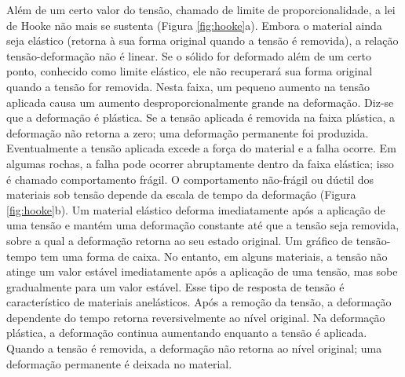 \documentclass[]{book}
\theoremstyle{definition}
\theoremstyle{definition}
\theoremstyle{definition}
\theoremstyle{remark}
\begin{document}
Além de um certo valor do tensão, chamado de limite de proporcionalidade, a lei de Hooke não mais se sustenta (Figura \ref{fig:hooke}a). Embora o material ainda seja elástico (retorna à sua forma original quando a tensão é removida), a relação tensão-deformação não é linear. Se o sólido for deformado além de um certo ponto, conhecido como limite elástico, ele não recuperará sua forma original quando a tensão for removida. Nesta faixa, um pequeno aumento na tensão aplicada causa um aumento desproporcionalmente grande na deformação. Diz-se que a deformação é plástica. Se a tensão aplicada é removida na faixa plástica, a deformação não retorna a zero; uma deformação permanente foi produzida. Eventualmente a tensão aplicada excede a força do material e a falha ocorre. Em algumas rochas, a falha pode ocorrer abruptamente dentro da faixa elástica; isso é chamado comportamento frágil. O comportamento não-frágil ou dúctil dos materiais sob tensão depende da escala de tempo da deformação (Figura \ref{fig:hooke}b). Um material elástico deforma imediatamente após a aplicação de uma tensão e mantém uma deformação constante até que a tensão seja removida, sobre a qual a deformação retorna ao seu estado original. Um gráfico de tensão-tempo tem uma forma de caixa. No entanto, em alguns materiais, a tensão não atinge um valor estável imediatamente após a aplicação de uma
tensão, mas sobe gradualmente para um valor estável. Esse tipo de resposta de tensão é característico de materiais anelásticos. Após a remoção da tensão, a deformação dependente do tempo retorna reversivelmente ao nível original. Na deformação plástica, a deformação continua aumentando enquanto a tensão é aplicada. Quando a tensão é removida, a deformação não retorna ao nível original; uma deformação permanente é deixada no material.
\end{document}
